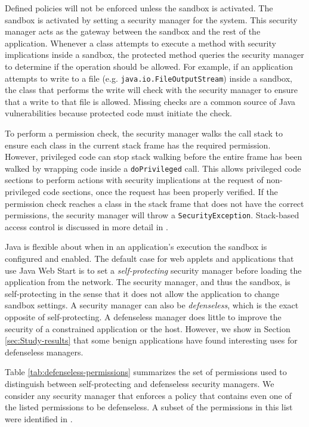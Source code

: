 \documentclass{sig-alternate}
\begin{document}
Defined policies will not be enforced unless the sandbox is activated.
The sandbox is activated by setting a security manager for the system.
This security manager acts as the gateway between the sandbox and
the rest of the application. Whenever a class attempts to execute
a method with security implications inside a sandbox, the protected
method queries the security manager to determine if the operation
should be allowed. For example, if an application attempts to write
to a file (e.g. \texttt{java.io.FileOutputStream}) inside a sandbox,
the class that performs the write will check with the security manager
to ensure that a write to that file is allowed. Missing checks are
a common source of Java vulnerabilities because protected code must
initiate the check. 

To perform a permission check, the security manager walks the call
stack to ensure each class in the current stack frame has the required
permission. However, privileged code can stop stack walking before
the entire frame has been walked by wrapping code inside a \texttt{doPrivileged}
call. This allows privileged code sections to perform actions with
security implications at the request of non-privileged code sections,
once the request has been properly verified. If the permission check
reaches a class in the stack frame that does not have the correct
permissions, the security manager will throw a \texttt{SecurityException}.
Stack-based access control is discussed in more detail in \cite{banerjee_stack-based_2005,besson_stack_2004,d._s._wallach_understanding_1998,erlingsson_irm_2000,fournet_stack_2002,pistoia_beyond_2007,zhao_type_2005}. 

Java is flexible about when in an application's execution the sandbox
is configured and enabled. The default case for web applets and applications
that use Java Web Start is to set a \textit{self-protecting} security
manager before loading the application from the network. The security
manager, and thus the sandbox, is self-protecting in the sense that
it does not allow the application to change sandbox settings. A security
manager can also be \textit{defenseless}, which is the exact opposite
of self-protecting. A defenseless manager does little to improve the
security of a constrained application or the host. However, we show
in Section \ref{sec:Study-results} that some benign applications
have found interesting uses for defenseless managers. 

Table \ref{tab:defenseless-permissions} summarizes the set of permissions
used to distinguish between self-protecting and defenseless security
managers. We consider any security manager that enforces a policy
that contains even one of the listed permissions to be defenseless.
A subset of the permissions in this list were identified in \cite{security_explorations_2012}. 
\end{document}
